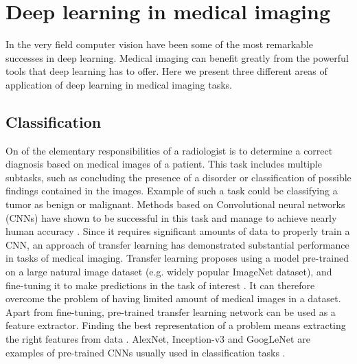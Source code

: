 


\section{Deep learning in medical imaging}
In the very field computer vision have been some of the most remarkable successes in deep learning. Medical imaging can benefit greatly from the powerful tools that deep learning has to offer. Here we present three different areas of application of deep learning in medical imaging tasks.
\subsection{Classification}
On of the elementary responsibilities of a radiologist is to determine a correct diagnosis based on medical images of a patient. This task includes multiple subtasks, such as concluding the presence of a disorder or classification of possible findings contained in the images. Example of such a task could be classifying a tumor as benign or malignant. Methods based on Convolutional neural networks (CNNs) have shown to be successful in this task and manage to achieve nearly human accuracy \cite{deeplearningHealthcare}. Since it requires significant amounts of data to properly train a CNN, an approach of transfer learning has demonstrated substantial performance in tasks of medical imaging. Transfer learning proposes using a model pre-trained on a large natural image dataset (e.g. widely popular ImageNet dataset), and fine-tuning it to make predictions in the task of interest \cite{IEEEtransfer}. It can therefore overcome the problem of having limited amount of medical images in a dataset. Apart from fine-tuning, pre-trained transfer learning network can be used as a feature extractor. Finding the best representation of a problem means extracting the right features from data \cite{surveyOnImageing}. AlexNet, Inception-v3 and GoogLeNet are examples of pre-trained CNNs usually used in classification tasks \cite{IEEEtransfer}.
